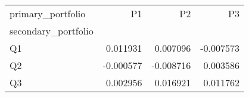 \begin{tabular}{lrrr}
\toprule
primary_portfolio & P1 & P2 & P3 \\
secondary_portfolio &  &  &  \\
\midrule
Q1 & 0.011931 & 0.007096 & -0.007573 \\
Q2 & -0.000577 & -0.008716 & 0.003586 \\
Q3 & 0.002956 & 0.016921 & 0.011762 \\
\bottomrule
\end{tabular}
